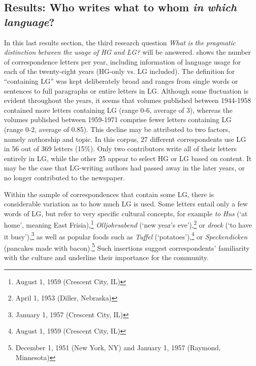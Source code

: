 \documentclass[output=paper]{langsci/langscibook}
\begin{document}
\subsection{Results: Who writes what to whom \textit{in} \textit{which} \textit{language}?} %
\label{sec:rocker:4.3}

 
In this last results section, the third research question \textit{What} \textit{is} \textit{the} \textit{pragmatic} \textit{distinction} \textit{between} \textit{the} \textit{usage} \textit{of} \textit{HG} \textit{and} \textit{LG?} will be answered.  shows the number of correspondence letters per year, including information of language usage for each of the twenty-eight years (HG-only vs. LG included). The definition for “containing LG” was kept deliberately broad and ranges from single words or sentences to full paragraphs or entire letters in LG. Although some fluctuation is evident throughout the years, it seems that volumes published between 1944-1958 contained more letters containing LG (range 0-6, average of 3), whereas the volumes published between 1959-1971 comprise fewer letters containing LG (range 0-2, average of 0.85). This decline may be attributed to two factors, namely authorship and topic. In this corpus, 27 different correspondents use LG in 56 out of 369 letters (15\%). Only two contributors write all of their letters entirely in LG, while the other 25 appear to select HG or LG based on content. It may be the case that LG-writing authors had passed away in the later years, or no longer contributed to the newspaper. 
 
Within the sample of correspondences that contain some LG, there is considerable variation as to how much LG is used. Some letters entail only a few words of LG, but refer to very specific cultural concepts, for example \textit{to} \textit{Hus} (‘at home’, meaning East Frisia),\footnote{August 1, 1959 (Crescent City, IL)} \textit{Olljohrsabend} (‘new year’s eve’),\footnote{April 1, 1953 (Diller, Nebraska)} or \textit{drock} (‘to have it busy’),\footnote{January 1, 1957 (Crescent City, IL)} as well as popular foods such as \textit{Tuffel} (‘potatoes’),\footnote{August 1, 1959 (Crescent City, IL)} or \textit{Speckendicken} (pancakes made with bacon).\footnote{December 1, 1951 (New York, NY) and January 1, 1957 (Raymond, Minnesota)} Such insertions suggest correspondents’ familiarity with the culture and underline their importance for the community. 
\end{document}
